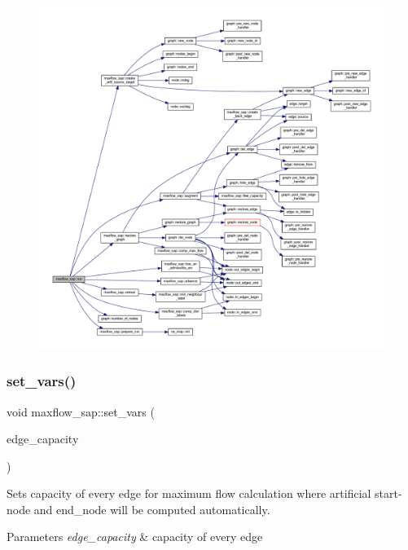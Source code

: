 \begin{figure}[H]
\begin{center}
\leavevmode
\includegraphics[width=350pt]{classmaxflow__sap_ab4305a2bb370ad9c43cc68d339b2dda0_cgraph}
\end{center}
\end{figure}
\mbox{\label{classmaxflow__sap_ac50ba0330c169c7ce697947a76702e13}} 
\subsubsection{\texorpdfstring{set\+\_\+vars()}{set\_vars()}\hspace{0.1cm}{\footnotesize\ttfamily [1/2]}}
{\footnotesize\ttfamily void maxflow\+\_\+sap\+::set\+\_\+vars (\begin{DoxyParamCaption}\item[{const \mbox{\hyperlink{classedge__map}{edge\+\_\+map}}$<$ double $>$ \&}]{edge\+\_\+capacity }\end{DoxyParamCaption})}

Sets capacity of every edge for maximum flow calculation where artificial start-\/node and end\+\_\+node will be computed automatically.


\begin{DoxyParams}{Parameters}
{\em edge\+\_\+capacity} & capacity of every edge \\
\hline
\end{DoxyParams}


